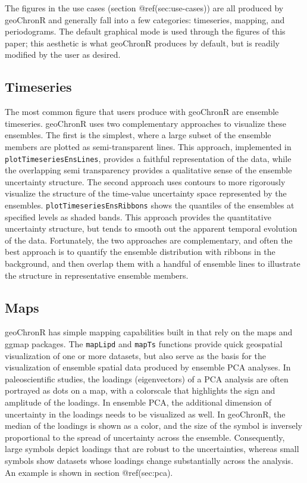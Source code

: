 \documentclass[gchron, manuscript]{copernicus}
\begin{document}
The figures in the use cases (section @ref(sec:use-cases)) are all
produced by geoChronR and generally fall into a few categories:
timeseries, mapping, and periodograms. The default graphical mode is
used through the figures of this paper; this aesthetic is what geoChronR
produces by default, but is readily modified by the user as desired.

\subsection{Timeseries}

The most common figure that users produce with geoChronR are ensemble
timeseries. geoChronR uses two complementary approaches to visualize
these ensembles. The first is the simplest, where a large subset of the
ensemble members are plotted as semi-transparent lines. This approach,
implemented in \texttt{plotTimeseriesEnsLines}, provides a faithful
representation of the data, while the overlapping semi transparency
provides a qualitative sense of the ensemble uncertainty structure. The
second approach uses contours to more rigorously visualize the structure
of the time-value uncertainty space represented by the ensembles.
\texttt{plotTimeseriesEnsRibbons} shows the quantiles of the ensembles
at specified levels as shaded bands. This approach provides the
quantitative uncertainty structure, but tends to smooth out the apparent
temporal evolution of the data. Fortunately, the two approaches are
complementary, and often the best approach is to quantify the ensemble
distribution with ribbons in the background, and then overlap them with
a handful of ensemble lines to illustrate the structure in
representative ensemble members.

\subsection{Maps}

geoChronR has simple mapping capabilities built in that rely on the maps
\citep{maps} and ggmap \citep{ggmap} packages. The \texttt{mapLipd} and
\texttt{mapTs} functions provide quick geospatial visualization of one
or more datasets, but also serve as the basis for the visualization of
ensemble spatial data produced by ensemble PCA analyses. In
paleoscientific studies, the loadings (eigenvectors) of a PCA analysis
are often portrayed as dots on a map, with a colorscale that highlights
the sign and amplitude of the loadings. In ensemble PCA, the additional
dimension of uncertainty in the loadings needs to be visualized as well.
In geoChronR, the median of the loadings is shown as a color, and the
size of the symbol is inversely proportional to the spread of
uncertainty across the ensemble. Consequently, large symbols depict
loadings that are robust to the uncertainties, whereas small symbols
show datasets whose loadings change substantially across the analysis.
An example is shown in section @ref(sec:pca).
\end{document}
